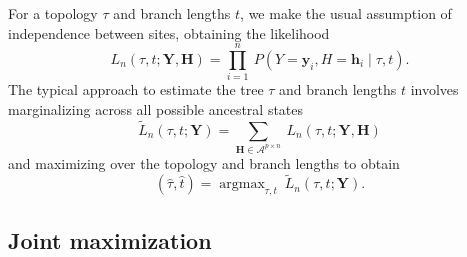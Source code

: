 \documentclass[a4paper]{article}
\newcommand{\alphabet}{\mathcal{A}}
\newcommand{\fullAlignment}{\mathbf{Y}}
\newcommand{\alignmentColumn}{\mathbf{y}}
\newcommand{\alignmentColumnRV}{Y}
\newcommand{\fullAncestralStates}{\mathbf{H}}
\newcommand{\ancestralStateColumn}{\mathbf{h}}
\newcommand{\ancestralStateColumnRV}{H}
\newcommand{\nCols}{n}
\newcommand{\nAncestralStateRows}{p}
\DeclareMathOperator*{\argmax}{argmax}
\begin{document}
For a topology $\tau$ and branch lengths $t$, we make the usual assumption of independence between sites, obtaining the likelihood
\begin{equation}
\label{eq:full_likelihood}
L_\nCols(\tau, t; \fullAlignment,\fullAncestralStates) = \prod_{i=1}^{\nCols} \ P(\alignmentColumnRV=\alignmentColumn_i, \ancestralStateColumnRV=\ancestralStateColumn_i \mid \tau, t).
\end{equation}
The typical approach to estimate the tree $\tau$ and branch lengths $t$ involves marginalizing across all possible ancestral states
\begin{equation}
\label{eq:marginal_likelihood}
\tilde{L}_\nCols(\tau, t; \fullAlignment) = \sum_{\fullAncestralStates\in\alphabet^{\nAncestralStateRows\times\nCols}} \ L_\nCols(\tau, t; \fullAlignment, \fullAncestralStates)
\end{equation}
and maximizing over the topology and branch lengths to obtain
$$
(\hat{\tau}, \hat{t}) = \argmax_{\tau, t} \  \tilde{L}_\nCols(\tau, t; \fullAlignment).
$$

\subsection{Joint maximization}
\end{document}
